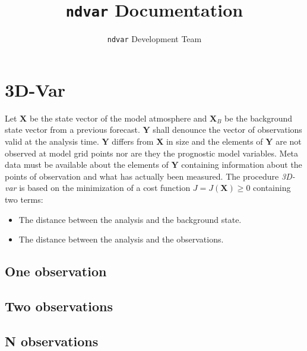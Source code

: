 \documentclass{report}
\title{\texttt{ndvar} Documentation}
\author{\texttt{ndvar} Development Team}
\date{}
\begin{document}
\maketitle

\chapter{3D-Var}
\label{chap:3d-var}


Let $\mathbf{X}$ be the state vector of the model atmosphere and $\mathbf{X}_B$ be the background state vector from a previous forecast. $\mathbf{Y}$ shall denounce the vector of observations valid at the analysis time. $\mathbf{Y}$ differs from $\mathbf{X}$ in size and the elements of $\mathbf{Y}$ are not observed at model grid points nor are they the prognostic model variables. Meta data must be available about the elements of $\mathbf{Y}$ containing information about the points of observation and what has actually been measured. The procedure \textit{3D-var} is based on the minimization of a cost function $J = J\left(\mathbf{X}\right) \geq 0$ containing two terms:
%
\begin{itemize}
\item The distance between the analysis and the background state.
\item The distance between the analysis and the observations.
\end{itemize}

\section{One observation}
\label{sec:one_observation}

\section{Two observations}
\label{sec:two_observations}

\section{N observations}
\label{sec:n_observations}
\end{document}
